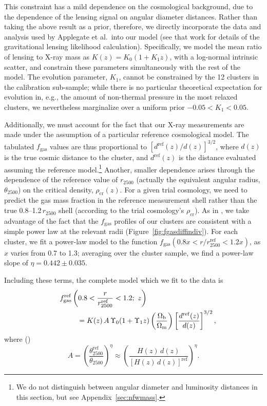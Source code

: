 \documentclass[useAMS,usenatbib,usegraphicx]{mn2e}
\newcommand*{\mysub}[2]{\ensuremath{#1_{\mathrm{#2}}}}
\newcommand*{\Omegam}{\mysub{\Omega}{m}}
\newcommand*{\Omegab}{\mysub{\Omega}{b}}
\newcommand*{\fgas}{\mysub{f}{gas}}
\newcommand*{\rhocr}{\mysub{\rho}{cr}}
\newcommand*{\appref}{Appendix}
\newcommand*{\figref}{Figure}
\newcommand*{\arsemf}{\citetalias{Allen0706.0033}}
\begin{document}
This constraint has a mild dependence on the cosmological background, due to the dependence of the lensing signal on angular diameter distances. Rather than taking the above result as a prior, therefore, we directly incorporate the data and analysis used by Applegate et al.\ into our model (see that work for details of the gravitational lensing likelihood calculation). Specifically, we model the mean ratio of lensing to X-ray mass as $K(z)=K_0(1+K_1 z)$, with a log-normal intrinsic scatter, and constrain these parameters simultaneously with the rest of the model. The evolution parameter, $K_1$, cannot be constrained by the 12 clusters in the calibration sub-sample; while there is no particular theoretical expectation for evolution in, e.g., the amount of non-thermal pressure in the most relaxed clusters, we nevertheless marginalize over a uniform prior $-0.05<K_1<0.05$.

Additionally, we must account for the fact that our X-ray measurements are made under the assumption of a particular reference cosmological model. The tabulated \fgas{} values are thus proportional to $[d^\mathrm{ref}(z)/d(z)]^{3/2}$, where $d(z)$ is the true cosmic distance to the cluster, and $d^\mathrm{ref}(z)$ is the distance evaluated assuming the reference model.\footnote{We do not distinguish between angular diameter and luminosity distances in this section, but see \appref~\ref{sec:nfwmass}.} Another, smaller dependence arises through the dependence of the reference value of $r_{2500}$ (actually the equivalent angular radius, $\theta_{2500}$) on the critical density, $\rhocr(z)$. For a given trial cosmology, we need to predict the gas mass fraction in the reference measurement shell rather than the true 0.8--1.2\,$r_{2500}$ shell (according to the trial cosmology's $\rhocr$). As in \arsemf{}, we take advantage of the fact that the \fgas{} profiles of our clusters are consistent with a simple power law at the relevant radii (\figref~\ref{fig:fgasdiffindiv}). For each cluster, we fit a power-law model to the function $\fgas(0.8x<r/r^\mathrm{ref}_{2500}<1.2x)$, as $x$ varies from 0.7 to 1.3; averaging over the cluster sample, we find a power-law slope of $\eta=0.442\pm0.035$. 

Including these terms, the complete model which we fit to the data is
\begin{eqnarray} \label{eq:fgasmodel}
  \fgas^\mathrm{ref}\left(0.8<\frac{r}{r^\mathrm{ref}_{2500}}<1.2; ~z\right) \hspace{3.4cm}\nonumber\\
  \hspace{4em}= K(z) \, A\, \Upsilon_0(1+\Upsilon_1 z) \left( \frac{\Omegab}{\Omegam} \right) \left[ \frac{d^\mathrm{ref}(z)}{d(z)} \right]^{3/2},
\end{eqnarray}
where (\arsemf)
\begin{equation} \label{eq:thetarat}
  A = \left( \frac{\theta^\mathrm{ref}_{2500}}{\theta_{2500}} \right)^\eta \approx \left( \frac{H(z) \, d(z)}{\left[H(z) \, d(z)\right]^\mathrm{ref}} \right)^\eta.
\end{equation}
\end{document}
